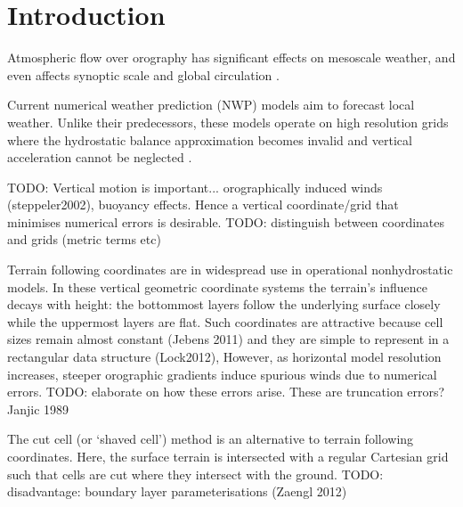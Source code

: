 \chapter{Introduction}


Atmospheric flow over orography has significant effects on mesoscale weather, and even affects synoptic scale and global circulation \autocite{good2013}.

Current numerical weather prediction (NWP) models aim to forecast local weather.  Unlike their predecessors, these models operate on high resolution grids where the hydrostatic balance approximation becomes invalid and vertical acceleration cannot be neglected \autocite{steppeler2002}.

TODO: Vertical motion is important... orographically induced winds (steppeler2002), buoyancy effects.  Hence a vertical coordinate/grid that minimises numerical errors is desirable. TODO: distinguish between coordinates and grids (metric terms etc)

Terrain following coordinates are in widespread use in operational nonhydrostatic models.  In these vertical geometric coordinate systems the terrain's influence decays with height: the bottommost layers follow the underlying surface closely while the uppermost layers are flat.  Such coordinates are attractive because cell sizes remain almost constant (Jebens 2011) and they are simple to represent in a rectangular data structure (Lock2012),  However, as horizontal model resolution increases, steeper orographic gradients induce spurious winds due to numerical errors. \autocite{TODO}  TODO: elaborate on how these errors arise.  These are truncation errors?  Janjic 1989

The cut cell (or `shaved cell')  method is an alternative to terrain following coordinates.  Here, the surface terrain is intersected with a regular Cartesian grid such that cells are cut where they intersect with the ground.  TODO: disadvantage: boundary layer parameterisations (Zaengl 2012)
